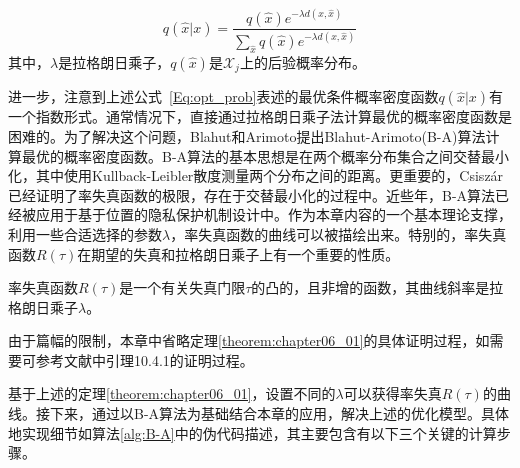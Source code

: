  \begin{equation}\label{Eq:opt_prob}
 q(\hat{x}|x)=\frac{q(\hat{x})e^{-\lambda d(x,\hat{x})}}{\sum_{\hat{x}}q(\hat{x})e^{-\lambda d(x,\hat{x})}}
 \end{equation}
其中，$\lambda$是拉格朗日乘子，$q(\hat{x})$是$\hat{\mathcal{X}}_j$上的后验概率分布。

进一步，注意到上述公式~\ref{Eq:opt_prob}表述的最优条件概率密度函数$q(\hat{x}|x)$有一个指数形式。通常情况下，直接通过拉格朗日乘子法计算最优的概率密度函数是困难的。为了解决这个问题，Blahut\cite{blahut1972computation}和Arimoto\cite{arimoto1972an}提出Blahut-Arimoto(B-A)算法计算最优的概率密度函数。B-A算法的基本思想是在两个概率分布集合之间交替最小化，其中使用Kullback-Leibler散度测量两个分布之间的距离。更重要的，Csisz\'{a}r\cite{csiszar1974on,csiszar1984information}已经证明了率失真函数的极限，存在于交替最小化的过程中。近些年，B-A算法已经被应用于基于位置的隐私保护机制设计中\cite{oya2017back,zhang2019online}。作为本章内容的一个基本理论支撑，利用一些合适选择的参数$\lambda$，率失真函数的曲线可以被描绘出来。特别的，率失真函数$R(\tau)$在期望的失真和拉格朗日乘子上有一个重要的性质。

\begin{theorem}\label{theorem:chapter06_01}
	率失真函数$R(\tau)$是一个有关失真门限$\tau$的凸的，且非增的函数，其曲线斜率是拉格朗日乘子$\lambda$。
\end{theorem}

由于篇幅的限制，本章中省略定理\ref{theorem:chapter06_01}的具体证明过程，如需要可参考文献中引理10.4.1的证明过程。

基于上述的定理\ref{theorem:chapter06_01}，设置不同的$\lambda$可以获得率失真$R(\tau)$的曲线。接下来，通过以B-A算法为基础结合本章的应用，解决上述的优化模型。具体地实现细节如算法\ref{alg:B-A}中的伪代码描述，其主要包含有以下三个关键的计算步骤。

